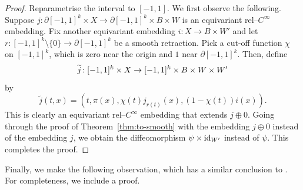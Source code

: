 \documentclass[11pt,psamsfonts, oneside, reqno]{amsart}
\newcommand{\sm}{\ensuremath{\setminus}}%
\newcommand{\cl}{\colon}
\newcommand{\ide}{\normalfont\text{id}}
\newcommand{\del}{\partial}
\newcommand{\wt}{\widetilde}
\theoremstyle{definition}
\theoremstyle{remark}
\numberwithin{equation}{section}
\begin{document}
\begin{proof} Reparametrise the interval to $[-1,1]$. We first observe the following. Suppose $j \cl \del[-1,1]^k\times X\to \del[-1,1]^k\times B\times W$ is an equivariant rel--$C^\infty$ embedding. Fix another equivariant embedding $i \cl X\to B\times W'$ and let $r \cl [-1,1]^k\sm\{0\}\to \del[-1,1]^k$ be a smooth retraction. Pick a cut-off function $\chi$ on $[-1,1]^k$, which is zero near the origin and $1$ near $\del[-1,1]^k$. Then, define 
\begin{equation*}\label{} 
	\notag\wt j \cl [-1,1]^k\times X\to [-1,1]^k\times B\times W\times W'
\end{equation*}
by 
\begin{equation}\label{} 
	\wt j(t,x) = (t,\pi(x),\chi(t)j_{r(t)}(x),(1-\chi(t))i(x)).
\end{equation}
This is clearly an equivariant rel--$C^\infty$ embedding that extends $j\oplus 0$. 
Going through the proof of Theorem~\ref{thm:to-smooth} with the embedding $j\oplus 0$ instead of the embedding $j$, we obtain the diffeomorphism $\psi\times \ide_{W'}$ instead of $\psi$. This completes the proof.
\end{proof}


Finally, we make the following observation, which has a similar conclusion to \cite[Lemma~4.5]{AMS21}. For completeness, we include a proof.
\end{document}
